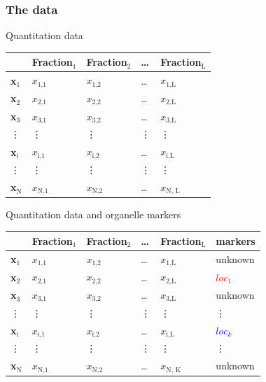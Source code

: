 \subsubsection*{The data}
\label{sec:data}

\begin{frame}{Quantitation data}
  \begin{center}
    \begin{tabular}{|l|llll|}
      \hline
      & Fraction$_{\text{1}}$ & Fraction$_{\text{2}}$ & \ldots{} & Fraction$_{\text{L}}$ \\
      \hline
      {\bf x}$_{\text{1}}$ & $x_{\text{1,1}}$ & $x_{\text{1,2}}$ & \ldots{} & $x_{\text{1,L}}$ \\
      {\bf x}$_{\text{2}}$ & $x_{\text{2,1}}$ & $x_{\text{2,2}}$ & \ldots{} & $x_{\text{2,L}}$ \\
      {\bf x}$_{\text{3}}$ & $x_{\text{3,1}}$ & $x_{\text{3,2}}$ & \ldots{} & $x_{\text{3,L}}$ \\
      \vdots & \vdots & \vdots & \vdots & \vdots \\
      {\bf x}$_{\text{i}}$ & $x_{\text{i,1}}$ & $x_{\text{i,2}}$ & \ldots{} & $x_{\text{i,L}}$ \\
      \vdots & \vdots & \vdots & \vdots & \vdots \\
      {\bf x}$_{\text{N}}$ & $x_{\text{N,1}}$ & $x_{\text{N,2}}$ & \ldots{} & $x_{\text{N, L}}$ \\
      \hline
    \end{tabular}
  \end{center}
\end{frame}

\begin{frame}{Quantitation data and organelle markers}
  \begin{center}
    \begin{tabular}{|l|llll||l|}
      \hline
      & Fraction$_{\text{1}}$ & Fraction$_{\text{2}}$ & \ldots{} & Fraction$_{\text{L}}$ & markers\\
      \hline
      {\bf x}$_{\text{1}}$ & $x_{\text{1,1}}$ & $x_{\text{1,2}}$ & \ldots{} & $x_{\text{1,L}}$ & unknown \\
      {\bf x}$_{\text{2}}$ & $x_{\text{2,1}}$ & $x_{\text{2,2}}$ & \ldots{} & $x_{\text{2,L}}$ & \textcolor{Red}{$loc_{1}$}\\
      {\bf x}$_{\text{3}}$ & $x_{\text{3,1}}$ & $x_{\text{3,2}}$ & \ldots{} & $x_{\text{3,L}}$ & unknown \\
      \vdots & \vdots & \vdots & \vdots & \vdots & \vdots \\
      {\bf x}$_{\text{i}}$ & $x_{\text{i,1}}$ & $x_{\text{i,2}}$ & \ldots{} & $x_{\text{i,L}}$ & \textcolor{Blue}{$loc_{k}$}\\
      \vdots & \vdots & \vdots & \vdots & \vdots & \vdots\\
      {\bf x}$_{\text{N}}$ & $x_{\text{N,1}}$ & $x_{\text{N,2}}$ & \ldots{} & $x_{\text{N, K}}$ & unknown \\
      \hline
    \end{tabular}
  \end{center}
\end{frame}


